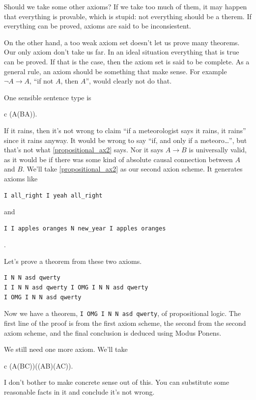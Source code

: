 \documentclass[11pt,oneside,%
]{memoir}
\newenvironment{eqna}{\begin{IEEEeqnarray}{c}}{\end{IEEEeqnarray}\ignorespacesafterend}
\theoremstyle{definition}
\newcommand{\propositio}{\lstinline[language=propositio]}
\begin{document}
Should we take some other axioms? If we take too much of them, it may happen that everything is provable, which is stupid: not everything should be a therem. If everything can be proved, axioms are said to be inconsiestent.

On the other hand, a too weak axiom set doesn't let us prove many theorems. Our only axiom don't take us far. In an ideal situation everything that is true can be proved. If that is the case, then the axiom set is said to be complete. As a general rule, an axiom should be something that make sense. For example \(\neg A\rightarrow A\), ``if not \(A\), then \(A\)'', would clearly not do that.

One sensible sentence type is
\begin{eqna}
    (A\rightarrow (B\rightarrow A)).\label{propositional_ax2}
\end{eqna}
If it rains, then it's not wrong to claim ``if a meteorologist says it rains, it rains'' since it rains anyway. It would be wrong to say ``if, and only if a meteoro\ldots'', but that's not what \eqref{propositional_ax2} says. Nor it says \(A\rightarrow B\) is universally valid, as it would be if there was some kind of absolute causal connection between \(A\) and \(B\). We'll take \eqref{propositional_ax2} as our second axion scheme. It generates axioms like %
\begin{lstlisting}[language=propositio]
I all_right I yeah all_right
\end{lstlisting}
and
\begin{lstlisting}[language=propositio]
I I apples oranges N new_year I apples oranges
\end{lstlisting}
.

Let's prove a theorem from these two axioms.
\begin{lstlisting}[language=propositio]
I N N asd qwerty
I I N N asd qwerty I OMG I N N asd qwerty
I OMG I N N asd qwerty
\end{lstlisting}
Now we have a theorem, \propositio!I OMG I N N asd qwerty!, of propositional logic. The first line of the proof is from the first axiom scheme, the second from the second axiom scheme, and the final conclusion is deduced using Modus Ponens.

We still need one more axiom. We'll take
\begin{eqna}
    (A\rightarrow(B\rightarrow C))\rightarrow((A\rightarrow B)\rightarrow(A\rightarrow C)).
\end{eqna}
I don't bother to make concrete sense out of this. You can substitute some reasonable facts in it and conclude it's not wrong.
\end{document}
